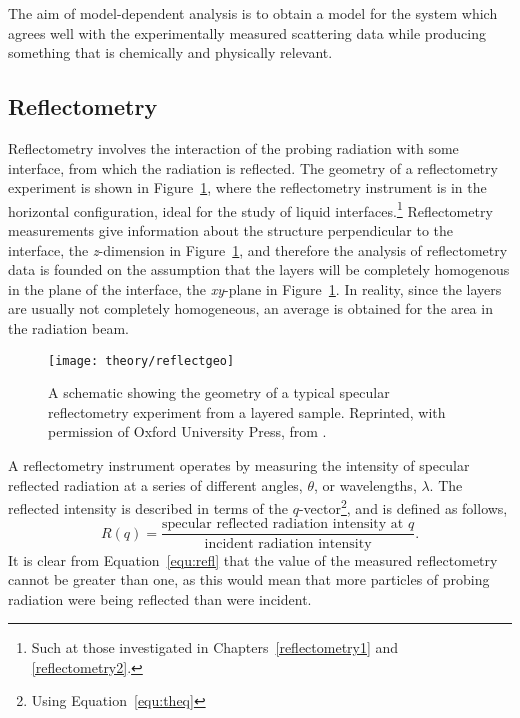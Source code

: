 The aim of model-dependent analysis is to obtain a model for the system which agrees well with the experimentally measured scattering data while producing something that is chemically and physically relevant.

\subsection{Reflectometry}
\label{sec:refltheory}

Reflectometry involves the interaction of the probing radiation with some interface, from which the radiation is reflected.
The geometry of a reflectometry experiment is shown in Figure~\ref{fig:refgeo}, where the reflectometry instrument is in the horizontal configuration, ideal for the study of liquid interfaces.\footnote{Such at those investigated in Chapters~\ref{reflectometry1} and \ref{reflectometry2}.}
Reflectometry measurements give information about the structure perpendicular to the interface, the \emph{z}-dimension in Figure~\ref{fig:refgeo}, and therefore the analysis of reflectometry data is founded on the assumption that the layers will be completely homogenous in the plane of the interface, the \emph{xy}-plane in Figure~\ref{fig:refgeo}.
In reality, since the layers are usually not completely homogeneous, an average is obtained for the area in the radiation beam.
%
\begin{figure}[t]
    \forcerectofloat
    \centering
    \texttt{[image: theory/reflectgeo]}
    \caption{A schematic showing the geometry of a typical specular reflectometry experiment from a layered sample. Reprinted, with permission of Oxford University Press, from \cite{sivia_elementary_2011}.}
    \label{fig:refgeo}
\end{figure}
%

A reflectometry instrument operates by measuring the intensity of specular reflected radiation at a series of different angles, $\theta$, or wavelengths, $\lambda$.
The reflected intensity is described in terms of the $q$-vector\footnote{Using Equation~\ref{equ:theq}}, and is defined as follows,
%
\begin{equation}
    R(q) = \frac{\text{specular reflected radiation intensity at }q}{\text{incident radiation intensity}}.
    \label{equ:refl}
\end{equation}
%
It is clear from Equation~\ref{equ:refl} that the value of the measured reflectometry cannot be greater than one, as this would mean that more particles of probing radiation were being reflected than were incident.

